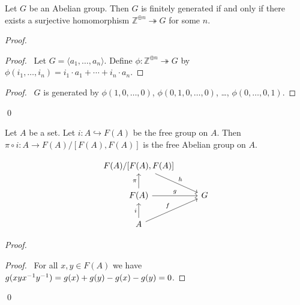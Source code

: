 \begin{prop}
Let $G$ be an Abelian group. Then $G$ is finitely generated if and only if there exists a surjective homomorphism $\mathbb{Z}^{\oplus n} \twoheadrightarrow G$ for some $n$.
\end{prop}

\begin{proof}
\pf
{}
\begin{proof}
	\pf\ Let $G = \langle a_1, \ldots, a_n \rangle$. Define $\phi : \mathbb{Z}^{\oplus n} \twoheadrightarrow G$ by $\phi(i_1, \ldots, i_n) = i_1 \cdot a_1 + \cdots + i_n \cdot a_n$.
\end{proof}
\begin{proof}
	\pf\ $G$ is generated by $\phi(1, 0, \ldots, 0)$, $\phi(0, 1, 0, \ldots, 0)$, \ldots, $\phi(0, \ldots, 0, 1)$.
\end{proof}
\qed
\end{proof}

\begin{prop}
Let $A$ be a set. Let $i : A \hookrightarrow F(A)$ be the free group on $A$. Then $\pi \circ i : A \rightarrow F(A) / [F(A),F(A)]$ is the free Abelian group on $A$.
\end{prop}

\[ \begin{tikzcd}
F(A)/[F(A),F(A)] \arrow[dr,"h"] \\
F(A) \arrow[r,"g"] \arrow[u,"\pi"] & G \\
A \arrow[u,"i"] \arrow[ur,"f"]
\end{tikzcd} \]

\begin{proof}
\pf
{}
\begin{proof}
	\pf\ For all $x,y \in F(A)$ we have $g(xy{x}^{-1}{y}^{-1}) = g(x) + g(y) - g(x) - g(y) = 0$.
\end{proof}
\qed
\end{proof}

